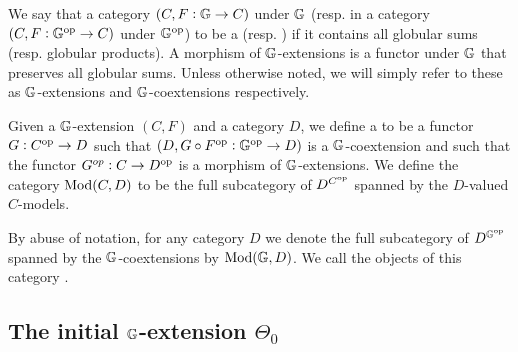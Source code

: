 \begin{defn}
We say that a category \((C,F:\mathbb{G}\to C)\) under \(\mathbb{G}\) (resp. in a category \((C,F:\mathbb{G}^{\operatorname{op}}\to C)\) under \(\mathbb{G}^{\operatorname{op}}\)) to be a  (resp. ) if it contains all globular sums (resp. globular products).  A morphism of \(\mathbb{G}\)-extensions is a functor under \(\mathbb{G}\) that preserves all  globular sums.  Unless otherwise noted, we will simply refer to these as \(\mathbb{G}\)-extensions and \(\mathbb{G}\)-coextensions respectively.
\end{defn}
 
\begin{defn}
Given a \(\mathbb{G}\)-extension \((C,F)\) and a category \(D\), we define a  to be a functor \(G:C^{\operatorname{op}}\to D\) such that \((D,G\circ F^{\operatorname{op}}:\mathbb{G}^{\operatorname{op}}\to D)\) is a \(\mathbb{G}\)-coextension and such that the functor \(G^{op}:C\to D^{\operatorname{op}}\) is a morphism of \(\mathbb{G}\)-extensions.  We define the category \(\operatorname{Mod}(C,D)\) to be the full subcategory of \(D^{C^{\operatorname{op}}}\) spanned by the \(D\)-valued \(C\)-models.  

By abuse of notation, for any category \(D\) we denote the full subcategory of \(D^{\mathbb{G}^{\operatorname{op}}}\) spanned by the \(\mathbb{G}\)-coextensions by \(\operatorname{Mod}(\mathbb{G},D)\).  We call the objects of this category .
\end{defn}

\subsection{The initial $\mathbb{G}$-extension $\Theta_0$}

